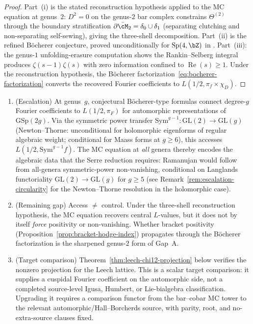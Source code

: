 \begin{proof}
Part~(i) is the stated reconstruction hypothesis applied to the MC
equation at genus~$2$:
$D^2 = 0$ on the genus-$2$ bar complex constrains
$\Theta^{(2)}$ through the boundary stratification
$\partial\bar{\cM}_2 = \delta_0 \cup \delta_1$
(separating clutching and non-separating self-sewing),
giving the three-shell decomposition.
Part~(ii) is the refined B\"ocherer conjecture,
proved unconditionally for $\mathrm{Sp}(4,\bZ)$ in
\cite{DPSS20}.
Part~(iii): the genus-$1$ unfolding-erasure computation shows
the Rankin--Selberg integral produces
$\zeta(s{-}1)\zeta(s)$ with zero information confined to
$\operatorname{Re}(s) \geq 1$.
Under the reconstruction hypothesis,
the B\"ocherer factorization~\eqref{eq:bocherer-factorization}
converts the recovered Fourier coefficients to
$L(1/2, \pi_f \times \chi_D)$.
\end{proof}

\begin{remark}%
\label{rem:bocherer-escalation}%
%
%
\begin{enumerate}[label=\textup{(\roman*)}]
\item \textup{(Escalation)} At genus~$g$, conjectural
 B\"ocherer-type formulas connect degree-$g$ Fourier
 coefficients to $L(1/2, \pi_F)$ for automorphic
 representations of~$\mathrm{GSp}(2g)$.
 Via the symmetric power transfer
 $\mathrm{Sym}^{g-1}: \mathrm{GL}(2) \to \mathrm{GL}(g)$
 (Newton--Thorne: unconditional for holomorphic eigenforms
 of regular algebraic weight; conditional for Maass forms
 at $g \geq 6$),
 this accesses $L(1/2, \mathrm{Sym}^{g-1} f)$.
 The MC equation at \emph{all} genera thereby encodes the
 algebraic data that the Serre reduction requires:
 Ramanujan would follow from all-genera symmetric-power
 non-vanishing, conditional on Langlands functoriality
 $\mathrm{GL}(2) \to \mathrm{GL}(g)$ for $g \geq 5$
 \textup{(}see Remark~\textup{\ref{rem:escalation-circularity}}
 for the Newton--Thorne resolution in the holomorphic
 case\textup{)}.
\item \textup{(Remaining gap)}
Access $\neq$ control.
Under the three-shell reconstruction hypothesis, the MC equation
recovers central $L$-values, but it does not by itself \emph{force}
positivity or non-vanishing.
 Whether bracket positivity
 (Proposition~\ref{prop:bracket-hodge-index})
 propagates through the B\"ocherer factorization is the
 sharpened genus-$2$ form of Gap~A.
\item \textup{(Target comparison)}
Theorem~\ref{thm:leech-chi12-projection} below verifies the nonzero
projection for the Leech lattice. This is a scalar target comparison:
it supplies a cuspidal Fourier coefficient on the automorphic side,
not a completed source-level Igusa, Humbert, or Lie-bialgebra
classification. Upgrading it requires a comparison functor from the
bar--cobar MC tower to the relevant automorphic/Hall--Borcherds
source, with parity, root, and no-extra-source clauses fixed.
\end{enumerate}
\end{remark}

